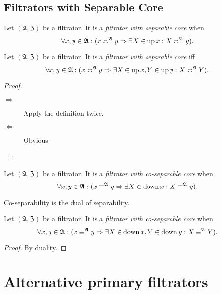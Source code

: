\subsection{Filtrators with Separable Core}
\begin{defn}
Let $(\mathfrak{A},\mathfrak{Z})$
be a filtrator. It is a \emph{filtrator with separable core} when
\[
\forall x,y\in\mathfrak{A}:(x\asymp^{\mathfrak{A}}y\Rightarrow\exists X\in\operatorname{up} x:X\asymp^{\mathfrak{A}}y).
\]
\end{defn}
\begin{prop}
Let $(\mathfrak{A},\mathfrak{Z})$ be a filtrator. It is a \emph{filtrator
with separable core} iff
\[
\forall x,y\in\mathfrak{A}:(x\asymp^{\mathfrak{A}}y\Rightarrow\exists X\in\operatorname{up} x,Y\in\operatorname{up} y:X\asymp^{\mathfrak{A}}Y).
\]
\end{prop}
\begin{proof}
~
\begin{description}
\item [{$\Rightarrow$}] Apply the definition twice.
\item [{$\Leftarrow$}] Obvious.
\end{description}
\end{proof}
\begin{defn}
Let $(\mathfrak{A},\mathfrak{Z})$
be a filtrator. It is a \emph{filtrator with co-separable core} when
\[
\forall x,y\in\mathfrak{A}:(x\equiv^{\mathfrak{A}}y\Rightarrow\exists X\in\operatorname{down} x:X\equiv^{\mathfrak{A}}y).
\]
\end{defn}
\begin{obvious}
Co-separability is the dual of separability.\end{obvious}
\begin{defn}
Let $(\mathfrak{A},\mathfrak{Z})$
be a filtrator. It is a \emph{filtrator with co-separable core} when
\[
\forall x,y\in\mathfrak{A}:(x\equiv^{\mathfrak{A}}y\Rightarrow\exists X\in\operatorname{down} x,Y\in\operatorname{down} y:X\equiv^{\mathfrak{A}}Y).
\]
\end{defn}
\begin{proof}
By duality.
\end{proof}

\section{Alternative primary filtrators}


